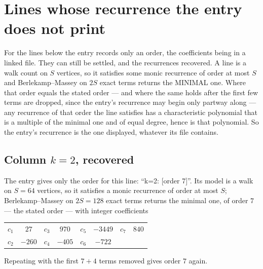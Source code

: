\documentclass[11pt,a4paper]{article}
\theoremstyle{plain}
\theoremstyle{definition}
\begin{document}
\section{Lines whose recurrence the entry does not print}

For the lines below the entry records only an order, the coefficients being in a linked file.
They can still be settled, and the recurrences recovered. A line is a walk count on $S$
vertices, so it satisfies some monic recurrence of order at most $S$ and Berlekamp--Massey on
$2S$ exact terms returns the MINIMAL one. Where that order equals the stated order --- and
where the same holds after the first few terms are dropped, since the entry's recurrence may
begin only partway along --- any recurrence of that order the line satisfies has a
characteristic polynomial that is a multiple of the minimal one and of equal degree, hence is
that polynomial. So the entry's recurrence is the one displayed, whatever its file contains.

\subsection*{Column $k=2$, recovered}
The entry gives only the order for this line: ``k=2: [order 7]''. Its model is a walk on
$S=64$ vertices, so it satisfies a monic recurrence of order at most $S$;
Berlekamp--Massey on $2S=128$ exact terms returns the minimal one, of order
$7$ --- the stated order --- with integer coefficients
\begin{center}\small\begin{tabular}{cccccccc}
$c_{1}$ & $27$ & $c_{3}$ & $970$ & $c_{5}$ & $-3449$ & $c_{7}$ & $840$ \\
$c_{2}$ & $-260$ & $c_{4}$ & $-405$ & $c_{6}$ & $-722$ &  &  \\
\end{tabular}\end{center}
Repeating with the first $7+4$ terms removed gives order $7$ again.
\end{document}
